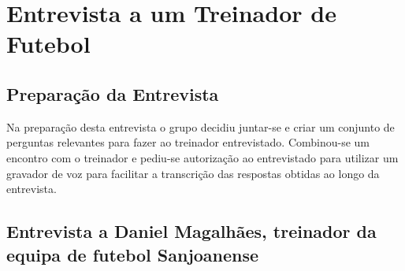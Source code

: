\chapter{Entrevista a um Treinador de Futebol}

\section{Preparação da Entrevista}

Na preparação desta entrevista o grupo decidiu juntar-se e criar um conjunto de perguntas relevantes para fazer ao treinador entrevistado.
Combinou-se um encontro com o treinador e pediu-se autorização ao entrevistado para utilizar um gravador de voz para facilitar a transcrição das respostas obtidas ao longo da entrevista.

\section{Entrevista a Daniel Magalhães, treinador da equipa de futebol Sanjoanense}

